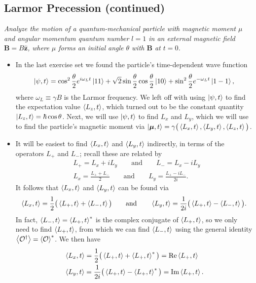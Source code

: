 \documentclass[11pt, a4paper]{article}
\newcommand{\eqtext}[1]{\qquad \text{#1} \qquad}
\renewcommand{\vec}[1]{\bm{#1}} %
\newcommand{\uvec}[1]{\hat{\vec{#1}}} %
\newcommand{\m}{\vec{\mu}}  %
\begin{document}
\subsection{Larmor Precession (continued)}
\textit{Analyze the motion of a quantum-mechanical particle with magnetic moment $ \mu $ and angular momentum quantum number $ l = 1 $ in an external magnetic field $ \vec{B} = B\uvec{z} $, where $ \mu $ forms an initial angle $ \theta $ with $ \vec{B} $ at $ t = 0 $.}
\begin{itemize}
	\item In the last exercise set we found the particle's time-dependent wave function
	\begin{equation*}
		\ket{\psi, t} =\cos^{2} \frac{\theta}{2} e^{i \omega_{L} t}\ket{11} + \sqrt{2}\sin \frac{\theta}{2} \cos \frac{\theta}{2} \ket{10} + \sin^{2}\frac{\theta}{2} e^{-\omega_{L} t}\ket{1 -1},
	\end{equation*}
	where $ \omega_{L} \equiv \gamma B $ is the Larmor frequency. We left off with using $ \ket{\psi, t} $ to find the expectation value $ \ev{L_{z}, t} $, which turned out to be the constant quantity $ \ket{L_{z}, t} = \hbar \cos \theta $. Next, we will use $ \ket{\psi, t} $ to find $ L_{x} $ and $ L_{y} $, which we will use to find the particle's magnetic moment via $ \ket{\m, t} = \gamma \big(\ev{L_{x}, t}, \ev{L_{y}, t}, \ev{L_{z}, t}\big) $.
	
	\item It will be easiest to find $ \ev{L_{x}, t} $ and $ \ev{L_{y}, t} $ indirectly, in terms of the operators $ L_{+} $ and $ L_{-} $; recall these are related by 
	\begin{align*}
		& L_{+} = L_{x} + iL_{y} \eqtext{and} L_{-} = L_{x} - i L_{y}\\
		& L_{x} = \frac{L_{+}+L_{-}}{2} \eqtext{and} L_{y} = \frac{L_{+} - iL_{-}}{2i}.
	\end{align*}
	It  follows that  $ \ev{L_{x}, t} $ and $ \ev{L_{y}, t} $ can be found via
	\begin{equation*}
		\ev{L_{x}, t} = \frac{1}{2}\big(\ev{L_{+}, t} + \ev{L_{-}, t} \big) \eqtext{and} \ev{L_{y}, t} = \frac{1}{2i}\big(\ev{L_{+}, t} - \ev{L_{-}, t} \big).
	\end{equation*}
	In fact, $ \ev{L_{-}, t} = \ev{L_{+}, t}^{*} $ is the complex conjugate of  $ \ev{L_{+}, t} $, so we only need to find $ \ev{L_{+}, t} $, from which we can find $ \ev{L_{-}, t} $ using the general identity $ \ev{\mathcal{O}^{\dagger}} = \ev{\mathcal{O}}^{*} $. We then have
	\begin{align*}
		& \ev{L_{x}, t} = \frac{1}{2}\big(\ev{L_{+}, t} + \ev{L_{+}, t}^{*} \big) = \Re \ev{L_{+}, t}\\
		& \ev{L_{y}, t} = \frac{1}{2i}\big(\ev{L_{+}, t} - \ev{L_{+}, t}^{*} \big) = \Im \ev{L_{+}, t}.
	\end{align*}
	

\end{itemize}
\end{document}
